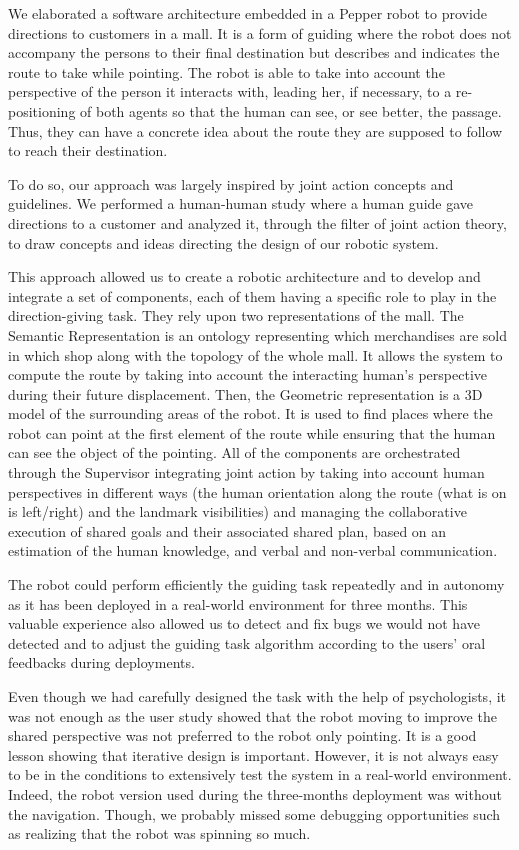 \documentclass[a4paper,11pt,twoside]{StyleThese}
\begin{document}
We elaborated a software architecture embedded in a Pepper robot to provide directions to customers in a mall. It is a form of guiding where the robot does not accompany the persons to their final destination but describes and indicates the route to take while pointing. The robot is able to take into account the perspective of the person it interacts with, leading her, if necessary, to a re-positioning of both agents so that the human can see, or see better, the passage. Thus, they can have a concrete idea about the route they are supposed to follow to reach their destination.

To do so, our approach was largely inspired by joint action concepts and guidelines. We performed a human-human study where a human guide gave directions to a customer and analyzed it, through the filter of joint action theory, to draw concepts and ideas directing the design of our robotic system.

This approach allowed us to create a robotic architecture and to develop and integrate a set of components, each of them having a specific role to play in the direction-giving task. They rely upon two representations of the mall. The Semantic Representation is an ontology representing which merchandises are sold in which shop along with the topology of the whole mall. It allows the system to compute the route by taking into account the interacting human's perspective during their future displacement. Then, the Geometric representation is a 3D model of the surrounding areas of the robot. It is used to find places where the robot can point at the first element of the route while ensuring that the human can see the object of the pointing. All of the components are orchestrated through the Supervisor integrating joint action by taking into account human perspectives in different ways (\ie the human orientation along the route (what is on is left/right) and the landmark visibilities) and managing the collaborative execution of shared goals and their associated shared plan, based on an estimation of the human knowledge, and verbal and non-verbal communication.

The robot could perform efficiently the guiding task repeatedly and in autonomy as it has been deployed in a real-world environment for three months. This valuable experience also allowed us to detect and fix bugs we would not have detected and to adjust the guiding task algorithm according to the users' oral feedbacks during deployments. 

Even though we had carefully designed the task with the help of psychologists, it was not enough as the user study showed that the robot moving to improve the shared perspective was not preferred to the robot only pointing. It is a good lesson showing that iterative design is important. However, it is not always easy to be in the conditions to extensively test the system in a real-world environment. Indeed, the robot version used during the three-months deployment was without the navigation. Though, we probably missed some debugging opportunities such as realizing that the robot was spinning so much.






\ifdefined{}
\else


\end{document}
